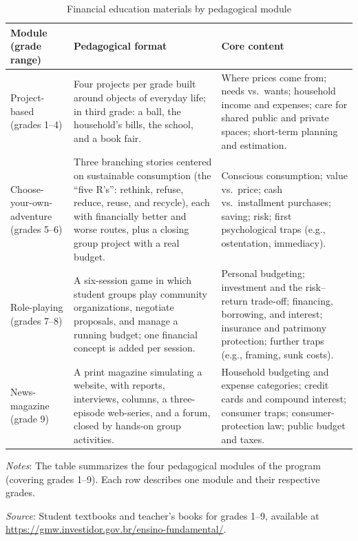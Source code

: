 \begin{table}[h!]
\centering
\fontsize{9}{11}\selectfont
\begin{threeparttable}
\caption{Financial education materials by pedagogical module}\label{tab:materials}
\begin{tabular}{p{2.8cm}p{4.5cm}p{7cm}}
\toprule
Module (grade range) & Pedagogical format & Core content \\
\midrule
Project-based (grades 1--4) & Four projects per grade built around objects of everyday life; in third grade: a ball, the household's bills, the school, and a book fair. & Where prices come from; needs vs.~wants; household income and expenses; care for shared public and private spaces; short-term planning and estimation. \\
\addlinespace
Choose-your-own-adventure (grades 5--6) & Three branching stories centered on sustainable consumption (the ``five R's'': rethink, refuse, reduce, reuse, and recycle), each with financially better and worse routes, plus a closing group project with a real budget. & Conscious consumption; value vs.~price; cash vs.~installment purchases; saving; risk; first psychological traps (e.g., ostentation, immediacy). \\
\addlinespace
Role-playing (grades 7--8) & A six-session game in which student groups play community organizations, negotiate proposals, and manage a running budget; one financial concept is added per session. & Personal budgeting; investment and the risk--return trade-off; financing, borrowing, and interest; insurance and patrimony protection; further traps (e.g., framing, sunk costs). \\
\addlinespace
News-magazine (grade 9) & A print magazine simulating a website, with reports, interviews, columns, a three-episode web-series, and a forum, closed by hands-on group activities. & Household budgeting and expense categories; credit cards and compound interest; consumer traps; consumer-protection law; public budget and taxes. \\
\bottomrule
\end{tabular}
\begin{tablenotes}
\fontsize{9}{9}\selectfont
\item \textit{Notes}: The table summarizes the four pedagogical modules of the program (covering grades 1--9). Each row describes one module and their respective grades. 
\item \textit{Source}: Student textbooks and teacher's books for grades 1--9, available at \url{https://gmw.investidor.gov.br/ensino-fundamental/}.
\end{tablenotes}
\end{threeparttable}
\end{table}


